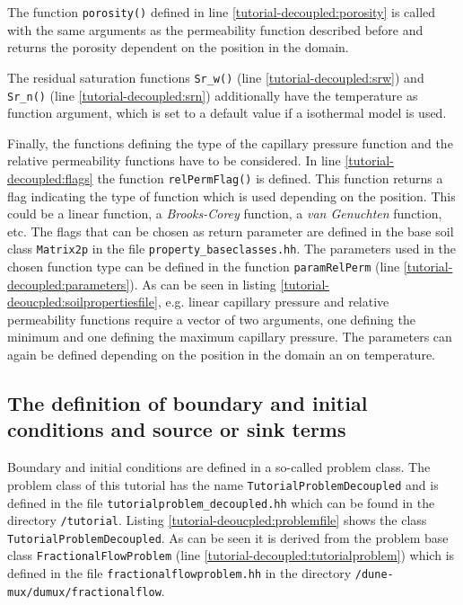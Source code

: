 The function \texttt{porosity()} defined in line \ref{tutorial-decoupled:porosity} is called with the same arguments as the permeability function described before and returns the porosity dependent on the position in the domain.

The residual saturation functions \texttt{Sr\_w()} (line \ref{tutorial-decoupled:srw}) and \texttt{Sr\_n()} (line \ref{tutorial-decoupled:srn}) additionally have the temperature as function argument, which is set to a default value if a isothermal model is used.

Finally, the functions defining the type of the capillary pressure function and the relative permeability functions have to be considered. In line \ref{tutorial-decoupled:flags} the function \texttt{relPermFlag()} is defined. This function returns a flag indicating the type of function which is used depending on the position. This could be a linear function, a \textit{Brooks-Corey} function, a \textit{van Genuchten} function, etc. The flags that can be chosen as return parameter are defined in the base soil class \texttt{Matrix2p} in the file \texttt{property\_baseclasses.hh}. The parameters used in the chosen function type can be defined in the function \texttt{paramRelPerm} (line \ref{tutorial-decoupled:parameters}). As can be seen in listing \ref{tutorial-deoucpled:soilpropertiesfile}, e.g. linear capillary pressure and relative permeability functions require a vector of two arguments, one defining the minimum and one defining the maximum capillary pressure. The parameters can again be defined depending on the position in the domain an on temperature.

\subsection{The definition of boundary and initial conditions and source or sink terms}\label{tutorial-decoupled:description-bc-ic}

Boundary and initial conditions are defined in a so-called problem class. The problem class of this tutorial has the name \texttt{TutorialProblemDecoupled} and is defined in the file \texttt{tutorialproblem\_decoupled.hh} which can be found in the directory \texttt{/tutorial}. Listing \ref{tutorial-deoucpled:problemfile} shows the class \texttt{TutorialProblemDecoupled}. As can be seen it is derived from the problem base class \texttt{FractionalFlowProblem} (line \ref{tutorial-decoupled:tutorialproblem}) which is defined in the file \texttt{fractionalflowproblem.hh} in the directory \texttt{/dune-mux/dumux/fractionalflow}. 

